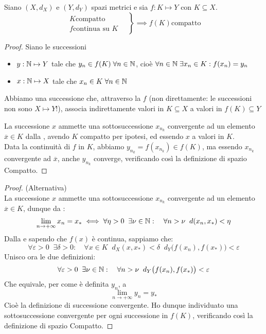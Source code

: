 \begin{theorem}
	\label{teo:weier_generale}
	Siano $(X,d_X)$ e $(Y,d_Y)$ spazi metrici e sia $f:K \mapsto Y$ con $K \subseteq X$.
	$$\left.\begin{array}{ll}
		K \text{compatto} \\
		f \text{continua su } K
		\end{array} \quad\right\} \implies f(K) \text{compatto}$$
	\begin{proof}
		Siano le successioni
		\begin{itemize}
			\item $y: \mathbb{N} \mapsto Y$ tale che $y_n \in f(K) \;\forall n \in \mathbb{N}$, cioè $\forall n \in \mathbb{N}\;\exists x_n \in K: f(x_n) = y_n$
			\item $x: \mathbb{N} \mapsto X$ tale che $x_n \in K\;\forall n \in \mathbb{N}$
		\end{itemize}
		\begin{note}
			Abbiamo una successione che, attraverso la $f$ (non direttamente: le successioni non sono $X \mapsto Y$!), associa indirettamente valori in $K \subseteq X$ a valori in $f(K) \subseteq Y$
		\end{note}
		La successione $x$ ammette una sottosuccessione $x_{n_k}$ convergente ad un elemento $\overline{x} \in K$ dalla , avendo $K$ compatto per ipotesi, ed essendo $x$ a valori in $K$.\\
		Data la continuità di $f$ in $K$, abbiamo $y_{n_k} = f(x_{n_k}) \in f(K)$, ma essendo $x_{n_k}$ convergente ad $\overline{x}$, anche $y_{n_k}$ converge, verificando così la definizione di spazio Compatto.
	\end{proof}
	\begin{proof} (Alternativa)\\
		La successione $x$ ammette una sottosuccessione $x_{n_k}$ convergente ad un elemento $\overline{x} \in K$, dunque da :
		$$\lim\limits_{n\rightarrow+\infty}x_n=x_*\iff\forall\eta > 0\;\;\exists\nu\in\mathbb{N}:\quad\forall n>\nu\;\;d(x_n,x_*)<\eta$$
		Dalla  e sapendo che $f(x)$ è continua, sappiamo che:
		$$\forall\varepsilon > 0\;\;\exists\delta > 0:\quad\forall x \in K\;\;d_X (x,x_*)<\delta\;\;d_Y \bigl(f(x_n),f(x_*)\bigr)<\varepsilon$$
		Unisco ora le due definizioni:
		$$\forall \varepsilon > 0\;\;\exists \nu \in \mathbb{N}:\quad \forall n > \nu\;\;d_Y \bigl(f(x_n),f(x_*)\bigr)<\varepsilon$$
		Che equivale, per come è definita $y_n$, a
		$$\lim\limits_{n\rightarrow +\infty}y_n = y_*$$
		Cioè la definizione di successione convergente. Ho dunque individuato una sottosuccessione convergente per ogni successione in $f(K)$, verificando così la definizione di spazio Compatto.
	\end{proof}
\end{theorem}


